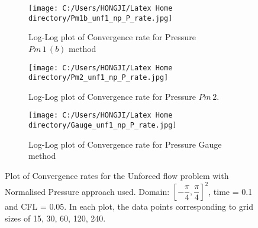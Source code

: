 \begin{figure}[H]
	\centering
	\begin{subfigure}[t]{4.5in}
		\centering
		\texttt{[image: C:/Users/HONGJI/Latex Home directory/Pm1b\_unf1\_np\_P\_rate.jpg]}
		\caption{Log-Log plot of Convergence rate for Pressure $Pm\,1\,(b)$ method}\label{fig:6.19a}		
	\end{subfigure}
	\quad
	\begin{subfigure}[t]{4.5in}
		\centering
		\texttt{[image: C:/Users/HONGJI/Latex Home directory/Pm2\_unf1\_np\_P\_rate.jpg]}
		\caption{Log-Log plot of Convergence rate for Pressure $Pm\,2$. }\label{fig:6.19b}
	\end{subfigure}
	\quad
	\begin{subfigure}[t]{4.5in}
		\centering
		\texttt{[image: C:/Users/HONGJI/Latex Home directory/Gauge\_unf1\_np\_P\_rate.jpg]}
		\caption{Log-Log plot of Convergence rate for Pressure Gauge method }\label{fig:6.19b}
	\end{subfigure}
	\caption{Plot of Convergence rates for the Unforced flow problem with Normalised Pressure approach used. Domain: $[-\dfrac{\pi}{4}, \dfrac{\pi}{4}]^2$, time = 0.1 and CFL = 0.05. In each plot, the data points corresponding to grid sizes of 15, 30, 60, 120, 240.}\label{fig:6.16}
\end{figure}

